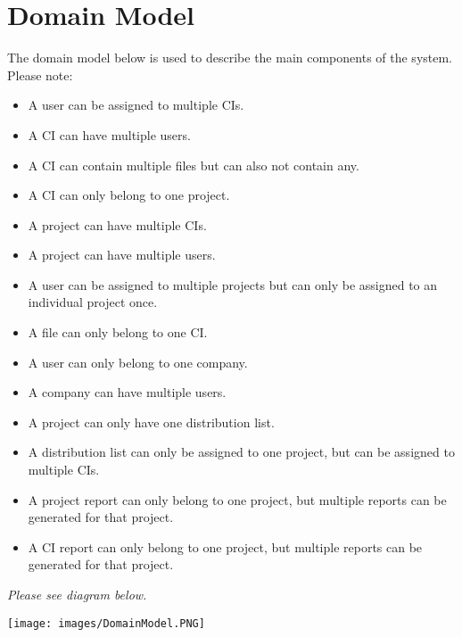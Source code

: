 \documentclass[11pt]{article}
\begin{document}
\newpage
\section{Domain Model}
\begin{flushleft}
The domain model below is used to describe the main components of the system. Please note:\\[0.5cm]
\begin{itemize}
    \item A user can be assigned to multiple CIs.
    \item A CI can have multiple users.
    \item A CI can contain multiple files but can also not contain any.
    \item A CI can only belong to one project.
    \item A project can have multiple CIs.
    \item A project can have multiple users.
    \item A user can be assigned to multiple projects but can only be assigned to an individual project once.
    \item A file can only belong to one CI.
    \item A user can only belong to one company.
    \item A company can have multiple users.
    \item A project can only have one distribution list.
    \item A distribution list can only be assigned to one project, but can be assigned to multiple CIs.
    \item A project report can only belong to one project, but multiple reports can be generated for that project.
    \item A CI report can only belong to one project, but multiple reports can be generated for that project.

\end{itemize}


\textit{Please see diagram below.}\\[0.5cm]
\end{flushleft}
\begin{sidewaysfigure}
    \texttt{[image: images/DomainModel.PNG]}
\end{sidewaysfigure}
 \newpage
 
 \newpage
\end{document}
